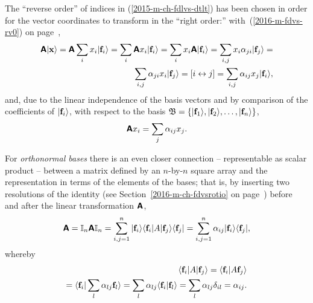 The ``reverse order'' of indices in (\ref{2015-m-ch-fdlvs-dtlt}) has been chosen
in order for the vector coordinates to transform in the ``right order:''
with~(\ref{2016-m-fdvs-rv0}) on page~\pageref{2016-m-fdvs-rv0},
\begin{equation}
\begin{split}
\textsf{\textbf{A}}\vert  {\bf x} \rangle =
\textsf{\textbf{A}} \sum_i x_i \vert  {\bf f}_i \rangle =
\sum_i \textsf{\textbf{A}} x_i \vert  {\bf f}_i \rangle =
\sum_i x_i \textsf{\textbf{A}} \vert  {\bf f}_i \rangle =
\sum_{i,j} x_i \alpha_{ji} \vert  {\bf f}_j \rangle =  \\
\sum_{i,j} \alpha_{ji}  x_i \vert  {\bf f}_j \rangle =
[i\leftrightarrow j] =
\sum_{i,j} \alpha_{ij}  x_j \vert  {\bf f}_i \rangle ,
\end{split}
\label{2016-m-ch-fdlvs-dtltk}
\end{equation}
and, due to the linear independence of the basis vectors and by comparison of the coefficients of $\vert  {\bf f}_i \rangle$,
with respect to  the basis
${\frak B}=\{\vert {\bf f}_1 \rangle ,\vert {\bf f}_2 \rangle,\ldots ,\vert {\bf f}_n \rangle\}$,
\begin{equation}
\textsf{\textbf{A}} x_i = \sum_{j} \alpha_{ij}  x_j  .
\label{2016-m-ch-fdlvs-dtltk1}
\end{equation}

For {\em orthonormal bases}
there is an even closer connection -- representable as scalar product -- between a matrix
defined by an $n$-by-$n$ square array and the representation in terms of the elements of the bases; that is,
 by inserting
two resolutions of the identity (see Section~\ref{2016-m-ch-fdvsrotio} on page~\pageref{2016-m-ch-fdvsrotio}) before and after the
linear transformation $\textsf{\textbf{A}}$,
\begin{equation}
\begin{split}
\textsf{\textbf{A}}  =
{\Bbb I}_n \textsf{\textbf{A}} {\Bbb I}_n  =
\sum_{i,j=1}^n
\vert {\bf f}_i\rangle \langle {\bf f}_i\vert A\vert {\bf f}_j\rangle \langle {\bf f}_j\vert  =
\sum_{i,j=1}^n \alpha_{ij}
\vert {\bf f}_i\rangle  \langle {\bf f}_j\vert,
\end{split}
\end{equation}
whereby
\begin{equation}
\begin{split}
 \langle {\bf f}_i \vert A \vert {\bf f}_j\rangle
= \langle {\bf f}_i \vert A   {\bf f}_j\rangle \\
= \langle {\bf f}_i \vert \sum_l \alpha_{lj}{\bf f}_l \rangle
=  \sum_l \alpha_{lj} \langle {\bf f}_i \vert {\bf f}_l \rangle
=  \sum_l \alpha_{lj} \delta_{il}  = \alpha_{ij}
.
\end{split}
\end{equation}






